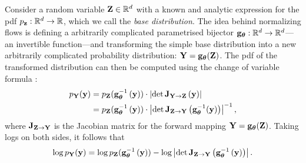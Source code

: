 \documentclass{statsmsc}
\begin{document}
Consider a random variable $\mathbf{Z} \in \mathbb{R}^d$ with a known and
analytic expression for the \ac{pdf} $p_{\mathbf{z}}: \mathbb{R}^d \rightarrow {\mathbb{R}}$, which we
call the \textit{base distribution}. The idea behind normalizing flows is
defining a arbitrarily complicated parametrised bijector
$\mathbf{g}_{\bm \theta}:\mathbb{R}^d \rightarrow {\mathbb{R}^d}$---an
invertible function---and transforming the simple base distribution into a new
arbitrarily complicated probability distribution: $\mathbf{Y}=\mathbf{g}_{\bm\theta}(\mathbf{Z})$. 
The \ac{pdf} of the transformed distribution can then be computed using the change of variable
formula \citep{normalizing_flows}:
\begin{align}
    p_{\mathbf{Y}}(\mathbf{y})&=p_{\mathbf{Z}}(\mathbf{g}_{\bm\theta}^{-1}\left(\mathbf{y}\right))\cdot \left|\det \mathbf{J}_{\mathbf{Y} \rightarrow {\mathbf{Z}}}\left(\mathbf{y} \right) \right| \nonumber \\
                & = p_{\mathbf{Z}}(\mathbf{g}_{\bm\theta}^{-1}\left(\mathbf{y}\right))\cdot \left|\det \mathbf{J}_{\mathbf{Z} \rightarrow {\mathbf{Y}}}\left( \mathbf{g}^{-1}_{\bm\theta}(\mathbf{y}) \right) \right|^{-1},
\end{align}
where $\mathbf{J}_{\mathbf{Z} \rightarrow {\mathbf{Y}}}$ is the Jacobian matrix for the forward mapping $\mathbf{Y} = \mathbf{g}_{\bm\theta}(\mathbf{Z})$.
Taking logs on both sides, it follows that
\begin{equation}\label{eq:logDetJac}
    \log p_{\mathbf{Y}}(\mathbf{y})= \log p_{\mathbf{Z}}(\mathbf{g}_{\bm\theta}^{-1}\left(\mathbf{y}\right)) - \log \left|\det \mathbf{J}_{\mathbf{Z} \rightarrow {\mathbf{Y}}}\left(\mathbf{g}_{\bm\theta}^{-1}\left(\mathbf{y}\right) \right) \right|.
\end{equation}
\end{document}
